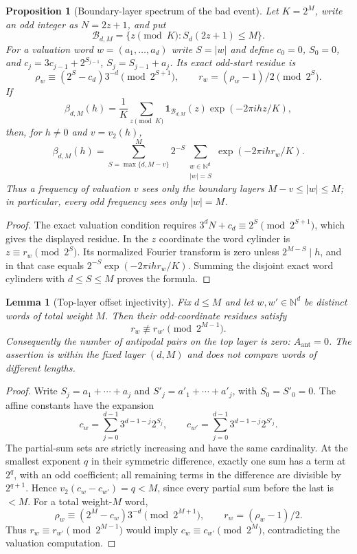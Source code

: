 \documentclass[12pt,a4paper]{article}
\newtheorem{lemma}[theorem]{Lemma}
\newtheorem{proposition}[theorem]{Proposition}
\begin{document}
\begin{proposition}[Boundary-layer spectrum of the bad event]
\label{prop:bad_boundary_spectrum}
Let $K=2^M$, write an odd integer as $N=2z+1$, and put
\[
 \mathcal B_{d,M}=\{z\pmod K:S_d(2z+1)\le M\}.
\]
For a valuation word $w=(a_1,\ldots,a_d)$ write $S=|w|$ and define
$c_0=0$, $S_0=0$, and
$c_j=3c_{j-1}+2^{S_{j-1}}$, $S_j=S_{j-1}+a_j$.  Its exact odd-start
residue is
\[
 \rho_w\equiv(2^S-c_d)3^{-d}\pmod{2^{S+1}},
 \qquad r_w=(\rho_w-1)/2\pmod{2^S}.
\]
If
\[
 \beta_{d,M}(h)=\frac1K\sum_{z\pmod K}
 \mathbf1_{\mathcal B_{d,M}}(z)\exp(-2\pi i hz/K),
\]
then, for $h\ne0$ and $v=v_2(h)$,
\[
 \boxed{
 \beta_{d,M}(h)=
 \sum_{S=\max\{d,M-v\}}^M2^{-S}
 \sum_{\substack{w\in\mathbb N^d\\|w|=S}}
 \exp(-2\pi i h r_w/K).}
\]
Thus a frequency of valuation $v$ sees only the boundary layers
$M-v\le |w|\le M$; in particular, every odd frequency sees only $|w|=M$.
\end{proposition}
\begin{proof}
The exact valuation condition requires
$3^dN+c_d\equiv2^S\pmod{2^{S+1}}$, which gives the displayed residue.
In the $z$ coordinate the word cylinder is $z\equiv r_w\pmod{2^S}$.
Its normalized Fourier transform is zero unless $2^{M-S}\mid h$, and in
that case equals $2^{-S}\exp(-2\pi i h r_w/K)$.  Summing the disjoint exact
 word cylinders with $d\le S\le M$ proves the formula.
\end{proof}
\begin{lemma}[Top-layer offset injectivity]
\label{lem:top_layer_offset_injectivity}
Fix $d\le M$ and let $w,w'\in\mathbb N^d$ be distinct words of total
weight $M$.  Then their odd-coordinate residues satisfy
\[
 r_w\not\equiv r_{w'}\pmod{2^{M-1}}.
\]
Consequently the number of antipodal pairs on the top layer is zero:
$A_{\mathrm{ant}}=0$.  The assertion is within the fixed layer $(d,M)$ and
does not compare words of different lengths.
\end{lemma}
\begin{proof}
Write $S_j=a_1+\cdots+a_j$ and $S'_j=a'_1+\cdots+a'_j$, with
$S_0=S'_0=0$.  The affine constants have the expansion
\[
 c_w=\sum_{j=0}^{d-1}3^{d-1-j}2^{S_j},
 \qquad
 c_{w'}=\sum_{j=0}^{d-1}3^{d-1-j}2^{S'_j}.
\]
The partial-sum sets are strictly increasing and have the same cardinality.
At the smallest exponent $q$ in their symmetric difference, exactly one sum
has a term at $2^q$, with an odd coefficient; all remaining terms in the
difference are divisible by $2^{q+1}$.  Hence
$v_2(c_w-c_{w'})=q<M$, since every partial sum before the last is $<M$.
For a total weight-$M$ word,
\[
 \rho_w\equiv(2^M-c_w)3^{-d}\pmod{2^{M+1}},
 \qquad r_w=(\rho_w-1)/2.
\]
Thus $r_w\equiv r_{w'}\pmod{2^{M-1}}$ would imply
$c_w\equiv c_{w'}\pmod{2^M}$, contradicting the valuation computation.
\end{proof}
\end{document}
